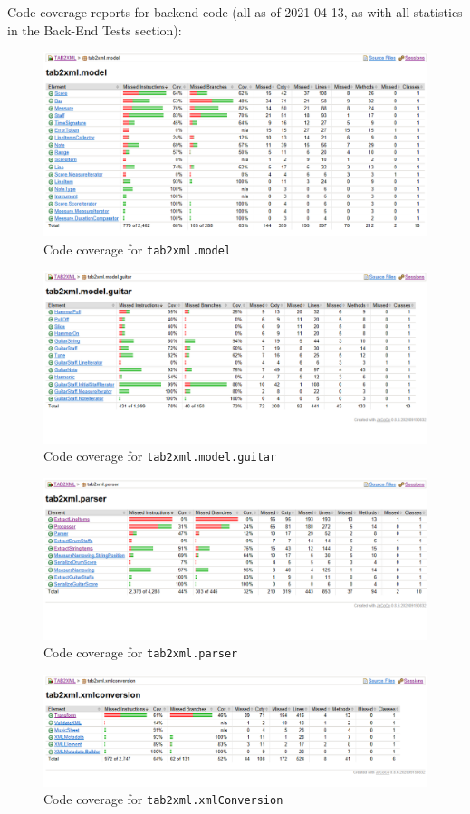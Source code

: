 \documentclass[11pt]{article}
\begin{document}
Code coverage reports for backend code (all as of 2021-04-13, as with all statistics in the Back-End Tests section): \\
\begin{figure}[htbp]
\centering
\includegraphics[width=.9\linewidth]{../Screenshots/test-coverage-20210413-model.png}
\caption{Code coverage for \texttt{tab2xml.model}}
\end{figure}
\begin{figure}[htbp]
\centering
\includegraphics[width=.9\linewidth]{../Screenshots/test-coverage-20210413-model-guitar.png}
\caption{Code coverage for \texttt{tab2xml.model.guitar}}
\end{figure}
\begin{figure}[htbp]
\centering
\includegraphics[width=.9\linewidth]{../Screenshots/test-coverage-20210413-parser.png}
\caption{Code coverage for \texttt{tab2xml.parser}}
\end{figure}
\begin{figure}[htbp]
\centering
\includegraphics[width=.9\linewidth]{../Screenshots/test-coverage-20210413-xmlconversion.png}
\caption{Code coverage for \texttt{tab2xml.xmlConversion}}
\end{figure}
\end{document}
